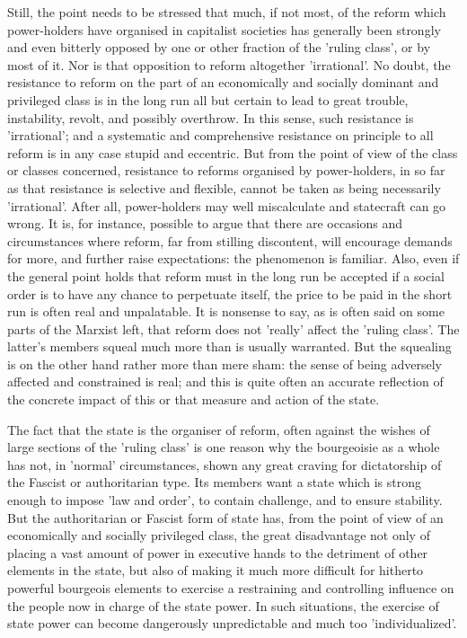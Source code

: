 Still, the point needs to be stressed that much, if not most, of the reform which power-holders have organised in capitalist societies has generally been strongly and even bitterly opposed by one or other fraction of the 'ruling class', or by most of it. Nor is that opposition to reform altogether 'irrational'. No doubt, the resistance to reform on the part of an economically and socially dominant and privileged class is in the long run all but certain to lead to great trouble, instability, revolt, and possibly overthrow. In this sense, such resistance is 'irrational'; and a systematic and comprehensive resistance on principle to all reform is in any case stupid and eccentric. But from the point of view of the class or classes concerned, resistance to reforms organised by power-holders, in so far as that resistance is selective and flexible, cannot be taken as being necessarily 'irrational'. After all, power-holders may well miscalculate and statecraft can go wrong. It is, for instance, possible to argue that there are occasions and circumstances where reform, far from stilling discontent, will encourage demands for more, and further raise expectations: the phenomenon is familiar. Also, even if the general point holds that reform must in the long run be accepted if a social order is to have any chance to perpetuate itself, the price to be paid in the short run is often real and unpalatable. It is nonsense to say, as is often said on some parts of the Marxist left, that reform does not 'really' affect the 'ruling class'. The latter's members squeal much more than is usually warranted. But the squealing is on the other hand rather more than mere sham: the sense of being adversely affected and constrained is real; and this is quite often an accurate reflection of the concrete impact of this or that measure and action of the state.

The fact that the state is the organiser of reform, often against the wishes of large sections of the 'ruling class' is one reason why the bourgeoisie as a whole has not, in 'normal' circumstances, shown any great craving for dictatorship of the Fascist  or authoritarian type. Its members want a state which is strong enough to impose 'law and order', to contain challenge, and to ensure stability. But the authoritarian or Fascist form of state has, from the point of view of an economically and socially privileged class, the great disadvantage not only of placing a vast amount of power in executive hands to the detriment of other elements in the state, but also of making it much more difficult for hitherto powerful bourgeois elements to exercise a restraining and controlling influence on the people now in charge of the state power. In such situations, the exercise of state power can become dangerously unpredictable and much too 'individualized'.

